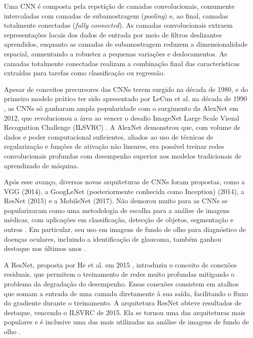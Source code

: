 \documentclass[12pt]{article}
\begin{document}
Uma CNN é composta pela repetição de camadas convolucionais, comumente intercaladas com camadas de subamostragem (\emph{pooling}) e, ao final, camadas totalmente conectadas (\emph{fully connected}). As camadas convolucionais extraem representações locais dos dados de entrada por meio de filtros deslizantes aprendidos, enquanto as camadas de subamostragem reduzem a dimensionalidade espacial, aumentando a robustez a pequenas variações e deslocamentos. As camadas totalmente conectadas realizam a combinação final das características extraídas para tarefas como classificação ou regressão.

Apesar de conceitos precursores das CNNs terem surgido na década de 1980, e do primeiro modelo prático ter sido apresentado por LeCun et al. na década de 1990 \cite{lecun1998gradient}, as CNNs só ganharam ampla popularidade com o surgimento da AlexNet em 2012, que revolucionou a área ao vencer o desafio ImageNet Large Scale Visual Recognition Challenge (ILSVRC) \cite{krizhevsky2012imagenet}. A AlexNet demonstrou que, com volume de dados e poder computacional suficientes, aliados ao uso de técnicas de regularização e funções de ativação não lineares, era possível treinar redes convolucionais profundas com desempenho superior aos modelos tradicionais de aprendizado de máquina.

Após esse avanço, diversas novas arquiteturas de CNNs foram propostas, como a VGG \cite{simonyan2015very} (2014), a GoogLeNet (posteriormente conhecida como Inception) \cite{szegedy2015going} (2014), a ResNet \cite{he2016deep} (2015) e a MobileNet \cite{howard2017mobilenet} (2017). Não demorou muito para as CNNs se popularizaram como uma metodologia de escolha para a análise de imagens médicas, com aplicações em classificação, detecção de objetos, segmentação e outros \cite{litjens_2017}. Em particular, seu uso em imagens de fundo de olho para diagnóstico de doenças oculares, incluindo a identificação de glaucoma, também ganhou destaque nos últimos anos \cite{li_review_2021}.

A ResNet, proposta por He et al. em 2015 \cite{he2016deep}, introduziu o conceito de conexões residuais, que permitem o treinamento de redes muito profundas mitigando o problema da degradação do desempenho. Essas conexões consistem em atalhos que somam a entrada de uma camada diretamente à sua saída, facilitando o fluxo do gradiente durante o treinamento. A arquitetura ResNet obteve resultados de destaque, vencendo o ILSVRC de 2015. Ela se tornou uma das arquiteturas mais populares e é inclusive uma das mais utilizadas na análise de imagens de fundo de olho \cite{li_review_2021}.
\end{document}

